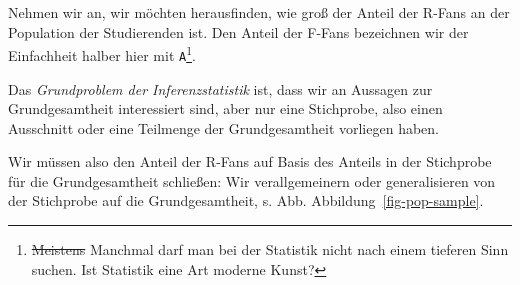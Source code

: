\documentclass[
  a4paper,
  DIV=11]{scrreprt}
\theoremstyle{definition}
\theoremstyle{remark}
\begin{document}
Nehmen wir an, wir möchten herausfinden, wie groß der Anteil der R-Fans
an der Population der Studierenden ist. Den Anteil der F-Fans bezeichnen
wir der Einfachheit halber hier mit \texttt{A}\footnote{\sout{Meistens}
  Manchmal darf man bei der Statistik nicht nach einem tieferen Sinn
  suchen. Ist Statistik eine Art moderne Kunst?}.

Das \emph{Grundproblem der Inferenzstatistik} ist, dass wir an Aussagen
zur Grundgesamtheit interessiert sind, aber nur eine Stichprobe, also
einen Ausschnitt oder eine Teilmenge der Grundgesamtheit vorliegen
haben.

Wir müssen also den Anteil der R-Fans auf Basis des Anteils in der
Stichprobe für die Grundgesamtheit schließen: Wir verallgemeinern oder
generalisieren von der Stichprobe auf die Grundgesamtheit, s. Abb.
Abbildung~\ref{fig-pop-sample}.
\end{document}
